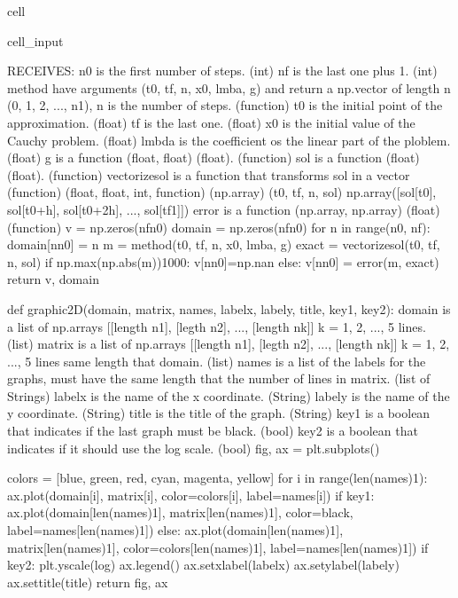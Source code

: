 \documentclass[letterpaper,10pt,english]{jupyterBook}
\begin{document}
\begin{sphinxuseclass}{cell}
\begin{sphinxVerbatimInput}
\begin{sphinxuseclass}{cell_input}
\begin{sphinxVerbatim}[commandchars=\\\{\}]
  RECEIVES:
  n0 is the first number of steps. (int)
  nf is the last one plus 1. (int)
  method have arguments (t0, tf, n, x0, lmba, g) and return a
  np.vector of length n (0, 1, 2, ..., n\PYGZhy{}1), n is the number of steps. (function)
  t0 is the initial point of the approximation. (float)
  tf is the last one. (float)
  x0 is the initial value of the Cauchy problem. (float)
  lmbda is the coefficient os the linear part of the ploblem. (float)
  g is a function (float, float) \PYGZhy{}\PYGZgt{} (float). (function)
  sol is a function (float) \PYGZhy{}\PYGZgt{} (float). (function)
  vectorize\PYGZus{}sol is a function that \PYGZdq{}transforms sol in a vector\PYGZdq{} (function)
  (float, float, int, function) \PYGZhy{}\PYGZgt{} (np.array)
  (t0, tf, n, sol) \PYGZhy{}\PYGZgt{} np.array([sol[t0], sol[t0+h], sol[t0+2h], ..., sol[tf\PYGZhy{}1]])
  error is a function (np.array, np.array) \PYGZhy{}\PYGZgt{} (float) (function)
  \PYGZsq{}\PYGZsq{}\PYGZsq{}
  v = np.zeros(nf\PYGZhy{}n0)
  domain = np.zeros(nf\PYGZhy{}n0)
  for n in range(n0, nf):
    domain[n\PYGZhy{}n0] = n
    m = method(t0, tf, n, x0, lmba, g)
    exact = vectorize\PYGZus{}sol(t0, tf, n, sol)
    if np.max(np.abs(m))\PYGZgt{}1000:
        v[n\PYGZhy{}n0]=np.nan
    else:
        v[n\PYGZhy{}n0] = error(m, exact)
  return v, domain

def graphic\PYGZus{}2D(domain, matrix, names, labelx, labely, title, key1, key2):
  \PYGZsq{}\PYGZsq{}\PYGZsq{}
  domain is a list of np.arrays [[length n1], [legth n2], ..., [length nk]]
  k = 1, 2, ..., 5 lines. (list)
  matrix is a list of np.arrays [[length n1], [legth n2], ..., [length nk]]
  k = 1, 2, ..., 5 lines \PYGZhy{} same length that domain. (list)
  names is a list of the labels for the graphs, must have the same length that
  the number of lines in matrix. (list of Strings)
  labelx is the name of the x coordinate. (String)
  labely is the name of the y coordinate. (String)
  title is the title of the graph. (String)
  key1 is a boolean that indicates if the last graph must be black. (bool)
  key2 is a boolean that indicates if it should use the log scale. (bool)
  \PYGZsq{}\PYGZsq{}\PYGZsq{}
  fig, ax = plt.subplots()

  colors = [\PYGZsq{}blue\PYGZsq{}, \PYGZsq{}green\PYGZsq{}, \PYGZsq{}red\PYGZsq{}, \PYGZsq{}cyan\PYGZsq{}, \PYGZsq{}magenta\PYGZsq{}, \PYGZsq{}yellow\PYGZsq{}]
  for i in range(len(names)\PYGZhy{}1):
    ax.plot(domain[i], matrix[i], color=colors[i], label=names[i])
  if key1:
    ax.plot(domain[len(names)\PYGZhy{}1], matrix[len(names)\PYGZhy{}1], color=\PYGZsq{}black\PYGZsq{}, label=names[len(names)\PYGZhy{}1])
  else:
    ax.plot(domain[len(names)\PYGZhy{}1], matrix[len(names)\PYGZhy{}1], color=colors[len(names)\PYGZhy{}1], label=names[len(names)\PYGZhy{}1])
  if key2:
    plt.yscale(\PYGZsq{}log\PYGZsq{})
  ax.legend()
  ax.set\PYGZus{}xlabel(labelx)
  ax.set\PYGZus{}ylabel(labely)
  ax.set\PYGZus{}title(title)
  return fig, ax


\end{sphinxVerbatim}
\end{sphinxuseclass}
\end{sphinxVerbatimInput}
\end{sphinxuseclass}
\end{document}
